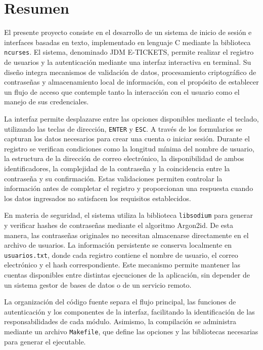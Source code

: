 \documentclass[11pt, letterpaper]{article}
\begin{document}
\renewcommand{\contentsname}{Contenido}

\section*{Resumen}
{}
El presente proyecto consiste en el desarrollo de un sistema de inicio de sesión e interfaces basadas en texto, implementado en lenguaje C mediante la biblioteca \texttt{ncurses}.
El sistema, denominado JDM E-TICKETS, permite realizar el registro de usuarios y la autenticación mediante una interfaz interactiva en terminal.
Su diseño integra mecanismos de validación de datos, procesamiento criptográfico de contraseñas y almacenamiento local de información, con el propósito de establecer un flujo de acceso que contemple tanto la interacción con el usuario como el manejo de sus credenciales.

La interfaz permite desplazarse entre las opciones disponibles mediante el teclado, utilizando las teclas de dirección, \texttt{ENTER} y \texttt{ESC}.
A través de los formularios se capturan los datos necesarios para crear una cuenta o iniciar sesión.
Durante el registro se verifican condiciones como la longitud mínima del nombre de usuario, la estructura de la dirección de correo electrónico, la disponibilidad de ambos identificadores, la complejidad de la contraseña y la coincidencia entre la contraseña y su confirmación.
Estas validaciones permiten controlar la información antes de completar el registro y proporcionan una respuesta cuando los datos ingresados no satisfacen los requisitos establecidos.

En materia de seguridad, el sistema utiliza la biblioteca \texttt{libsodium} para generar y verificar hashes de contraseñas mediante el algoritmo Argon2id.
De esta manera, las contraseñas originales no necesitan almacenarse directamente en el archivo de usuarios.
La información persistente se conserva localmente en \texttt{usuarios.txt}, donde cada registro contiene el nombre de usuario, el correo electrónico y el hash correspondiente.
Este mecanismo permite mantener las cuentas disponibles entre distintas ejecuciones de la aplicación, sin depender de un sistema gestor de bases de datos o de un servicio remoto.

La organización del código fuente separa el flujo principal, las funciones de autenticación y los componentes de la interfaz, facilitando la identificación de las responsabilidades de cada módulo.
Asimismo, la compilación se administra mediante un archivo \texttt{Makefile}, que define las opciones y las bibliotecas necesarias para generar el ejecutable.
\end{document}
